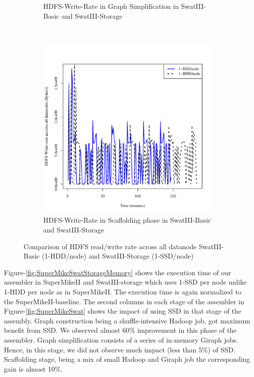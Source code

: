 \documentclass[conference]{IEEEtran}
\begin{document}
\begin{figure}[t]
\begin{subfigure}[b]{0.2\textwidth}
                \caption{HDFS-Write-Rate in Graph Simplification in SwatIII-Basic and SwatIII-Storage}
                \label{fig:ECHddSsdHdfsWrIops}
        \end{subfigure}
        ~ %
        \begin{subfigure}[b]{0.2\textwidth}
                \includegraphics[width=\textwidth]{Figure/SystemData/Plots/SCFHddSsdHdfsWrIops.pdf}
                \caption{HDFS-Write-Rate in Scaffolding phase in SwatIII-Basic and SwatIII-Storage}
                \label{fig:SCFHddSsdHdfsWrIops}
        \end{subfigure}        
        \caption{Comparison of HDFS read/write rate across all datanode SwatIII-Basic (1-HDD/node) and SwatIII-Storage (1-SSD/node)}\label{fig:HddSsdHdfsRWps}
        
\end{figure}

Figure-\ref{fig:SuperMikeSwatStorageMemory} shows the execution time of our assembler in SuperMikeII and SwatIII-storage which uses 1-SSD per node unlike 1-HDD per node as in SuperMikeII.
The execution time is again normalized to the SuperMikeII-baseline.
The second columns in each stage of the assembler in Figure-\ref{fig:SuperMikeSwat} shows the impact of using SSD in that stage of the assembly.
Graph construction being a shuffle-intensive Hadoop job, got maximum benefit from SSD. We observed almost 60\% improvement in this phase of the assembler. Graph simplification consists of a series of in-memory Giraph jobs. Hence, in this stage, we did not observe much impact (less than 5\%) of SSD. Scaffolding stage, being a mix of small Hadoop and Giraph job the corresponding gain is almost 10\%.
\end{document}
